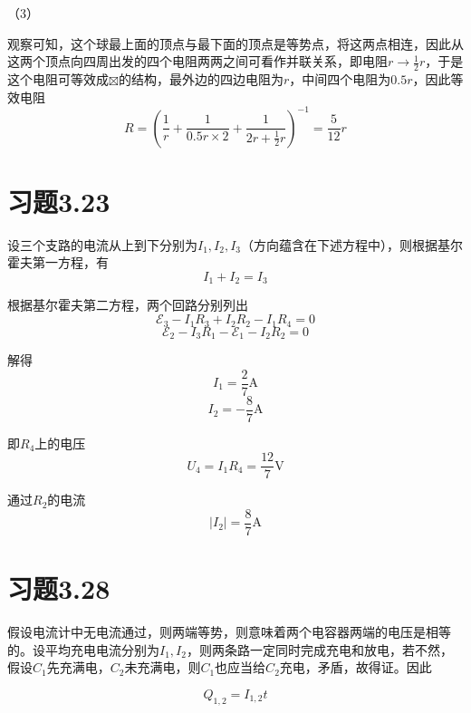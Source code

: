\documentclass{SCIS2020cn}
\begin{document}
（3）

观察可知，这个球最上面的顶点与最下面的顶点是等势点，将这两点相连，因此从这两个顶点向四周出发的四个电阻两两之间可看作并联关系，即电阻$\displaystyle{}r\rightarrow\frac{1}{2}r$，于是这个电阻可等效成$\boxtimes$的结构，最外边的四边电阻为$r$，中间四个电阻为$0.5r$，因此等效电阻
\begin{equation}
    R=\left(\frac{1}{r}+\frac{1}{0.5r×2}+\frac{1}{2r+\frac{1}{2}r}\right)^{-1}=\frac{5}{12}r
\end{equation}

\section{习题3.23}
设三个支路的电流从上到下分别为$I_1,I_2,I_3$（方向蕴含在下述方程中），则根据基尔霍夫第一方程，有
\begin{equation}
    I_1+I_2=I_3
\end{equation}

根据基尔霍夫第二方程，两个回路分别列出
\begin{equation}
    \mathscr{E}_3-I_1R_3+I_2R_2-I_1R_4=0
\end{equation}
\begin{equation}
    \mathscr{E}_2-I_3R_1-\mathscr{E}_1-I_2R_2=0
\end{equation}

解得
\begin{equation}
    I_1=\frac{2}{7}\text{A}
\end{equation}
\begin{equation}
    I_2=-\frac{8}{7}\text{A}
\end{equation}

即$R_4$上的电压
\begin{equation}
    U_4=I_1R_4=\frac{12}{7}\text{V}
\end{equation}

通过$R_2$的电流
\begin{equation}
    |I_2|=\frac{8}{7}\text{A}
\end{equation}

\section{习题3.28}
假设电流计中无电流通过，则两端等势，则意味着两个电容器两端的电压是相等的。设平均充电电流分别为$I_1,I_2$，则两条路一定同时完成充电和放电，若不然，假设$C_1$先充满电，$C_2$未充满电，则$C_1$也应当给$C_2$充电，矛盾，故得证。因此

\begin{equation}
    Q_{1,2}=I_{1,2}t
\end{equation}
\end{document}
